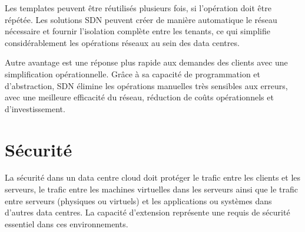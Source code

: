 Les templates peuvent être réutilisés plusieurs fois, si l'opération doit être répétée. Les solutions SDN peuvent créer de manière automatique le réseau nécessaire et fournir l'isolation complète entre les tenants, ce qui simplifie considérablement les opérations réseaux au sein des data centres. 

Autre avantage est une réponse plus rapide aux demandes des clients avec une simplification opérationnelle. Grâce à sa capacité de programmation et d'abstraction, SDN élimine les opérations manuelles très sensibles aux erreurs, avec une meilleure efficacité du réseau, réduction de coûts opérationnels et d'investissement. \cite{leveragingSDNCloudNetworkServiceExample} \cite{leveragingSDNCloudDCWAN}

\section{Sécurité}

La sécurité dans un data centre cloud doit protéger le trafic entre les clients et les serveurs, le trafic entre les machines virtuelles dans les serveurs ainsi que le trafic entre serveurs (physiques ou virtuels) et les applications ou systèmes dans d'autres data centres. La capacité d'extension représente une requis de sécurité essentiel dans ces environnements. 



